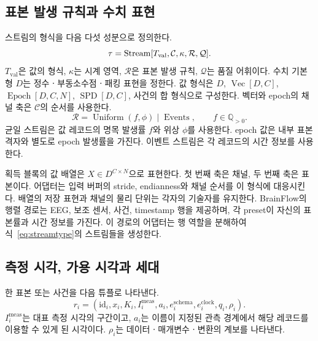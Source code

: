 \subsection{표본 발생 규칙과 수치 표현}
\begin{definition}[스트림 형식]
스트림의 형식을 다음 다섯 성분으로 정의한다.
\begin{equation}
 \tau=\operatorname{Stream}[T_{\mathrm{val}},\mathcal C,\kappa,\mathcal R,\mathcal Q].
 \label{eq:streamtype}
\end{equation}
$T_{\mathrm{val}}$은 값의 형식, $\kappa$는 시계 영역,
$\mathcal R$은 표본 발생 규칙, $\mathcal Q$는 품질 어휘이다.
수치 기본형 $D$는 정수ㆍ부동소수점ㆍ패킹 표현을 정한다.
값 형식은 $D$, $\operatorname{Vec}[D,C]$, $\operatorname{Epoch}[D,C,N]$,
$\operatorname{SPD}[D,C]$, 사건의 합 형식으로 구성한다.
벡터와 epoch의 채널 축은 $\mathcal C$의 순서를 사용한다.
\begin{equation}
 \mathcal R=\operatorname{Uniform}(f,\phi)
 \mid\operatorname{Events},\qquad f\in\mathbb Q_{>0}.
\end{equation}
균일 스트림은 값 레코드의 명목 발생률 $f$와 위상 $\phi$를 사용한다.
epoch 값은 내부 표본 격자와 별도로 epoch 발생률을 가진다.
이벤트 스트림은 각 레코드의 시간 정보를 사용한다.
\end{definition}

획득 블록의 값 배열은 $X\in D^{C\times N}$으로 표현한다. 첫 번째 축은 채널,
두 번째 축은 표본이다. 어댑터는 입력 버퍼의 stride, endianness와 채널 순서를
이 형식에 대응시킨다. 배열의 저장 표현과 채널의 물리 단위는 각자의 기술자를 유지한다.
BrainFlow의 행렬 경로는 EEG, 보조 센서, 사건, timestamp 행을 제공하며,
각 preset이 자신의 표본률과 시간 정보를 가진다\cite{brainflow_data}.
이 경로의 어댑터는 행 역할을 분해하여 식~\eqref{eq:streamtype}의 스트림들을 생성한다.

\subsection{측정 시각, 가용 시각과 세대}
\begin{definition}[시간 레코드]
한 표본 또는 사건을 다음 튜플로 나타낸다.
\begin{equation}
 r_i=(\mathrm{id}_i,x_i,K_i,I_i^{\mathrm{meas}},a_i,
       e_i^{\mathrm{schema}},e_i^{\mathrm{clock}},q_i,\rho_i).
 \label{eq:record}
\end{equation}
$I_i^{\mathrm{meas}}$는 대표 측정 시각의 구간이고, $a_i$는 이름이 지정된 관측 경계에서
해당 레코드를 이용할 수 있게 된 시각이다. $\rho_i$는 데이터ㆍ매개변수ㆍ변환의 계보를 나타낸다.
\end{definition}

